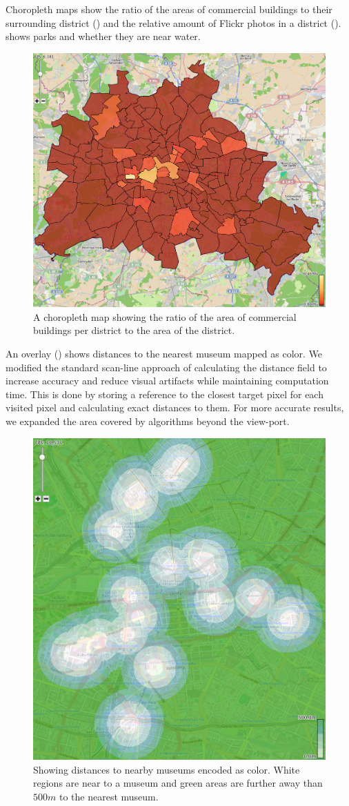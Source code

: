 Choropleth maps show the ratio of the areas of commercial buildings to their surrounding
district () and the relative amount of
Flickr photos in a district ().
 shows parks and whether they are near water.
\begin{figure}
        \centering
		\includegraphics[width=0.6\linewidth]{imgs/commercial}
        \caption{A choropleth map showing the ratio of the area of commercial buildings
        per district to the area of the district.}
		\label{fig:commercial}
\end{figure}
An overlay () shows distances to the nearest museum mapped as color.
We modified the standard scan-line approach of calculating the distance field to
increase accuracy and reduce visual artifacts while maintaining computation time.
This is done by storing a reference to the closest target pixel for each visited
pixel and calculating exact distances to them. For more accurate
results, we expanded the area covered by algorithms beyond the view-port.
\begin{figure}[b]
        \centering
		\includegraphics[width=0.4\linewidth]{imgs/museum}
        \caption{Showing distances to nearby museums encoded as color. White regions
        are near to a museum and green areas are further away than $500m$ to the
        nearest museum.}
		\label{fig:museum}
\end{figure}
